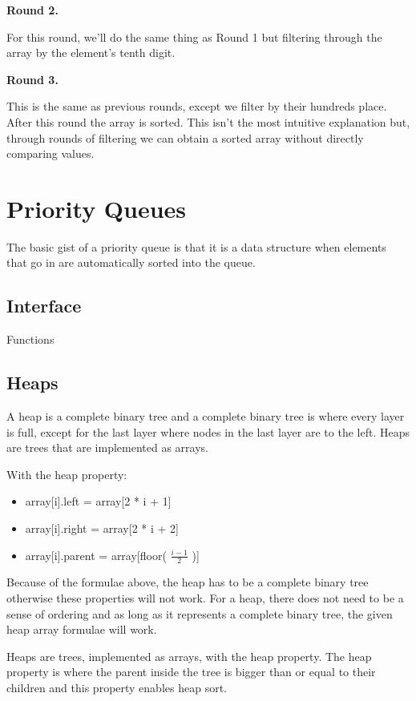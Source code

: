 \documentclass[11pt,a4paper,english]{article}
\begin{document}
\bigskip
\noindent \textbf{Round 2.}

\noindent For this round, we'll do the same thing as Round 1 but filtering through the array by the element's tenth digit.

\bigskip

\noindent \textbf{Round 3.} 

\noindent This is the same as previous rounds, except we filter by their hundreds place. After this round the array is sorted. This isn't the most intuitive explanation but, through rounds of filtering we can obtain a sorted array without directly comparing values.

\section{Priority Queues}

The basic gist of a priority queue is that it is a data structure when elements that go in are automatically sorted into the queue.

\subsection{Interface}

\begin{bbox}{Functions}{



}\end{bbox}

\subsection{Heaps}

A heap is a complete binary tree and a complete binary tree is where every layer is full, except for the last layer where nodes in the last layer are to the left. Heaps are trees that are implemented as arrays.

\bigskip \noindent 
With the heap property:
\begin{itemize}
  \item array[i].left = array[2 * i + 1]
  \item array[i].right = array[2 * i + 2]
  \item array[i].parent = array[floor( $\frac{i - 1}{2}$ )]
\end{itemize}

\noindent Because of the formulae above, the heap has to be a complete binary tree otherwise these properties will not work. For a heap, there does not need to be a sense of ordering and as long as it represents a complete binary tree, the given heap array formulae will work.

\bigskip 
\noindent 
Heaps are trees, implemented as arrays, with the heap property. The heap property is where the parent inside the tree is bigger than or equal to their children and this property enables heap sort.
\end{document}
